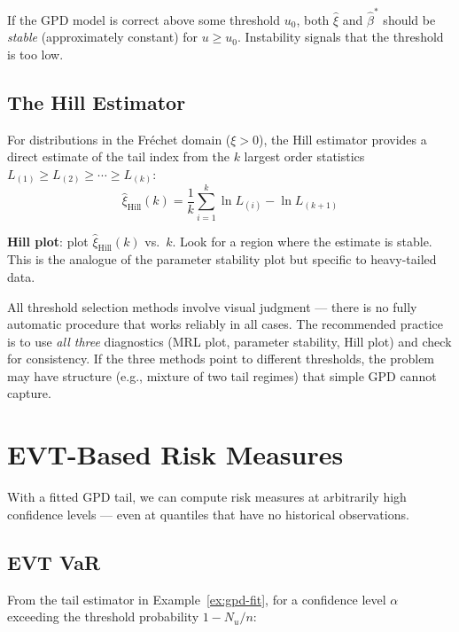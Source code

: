 \documentclass[11pt, a4paper]{article}
\theoremstyle{definition}
\theoremstyle{plain}
\theoremstyle{remark}
\begin{document}
If the GPD model is correct above some threshold $u_0$,
both $\hat\xi$ and $\hat\beta^*$ should be \emph{stable} (approximately constant) for $u \geq u_0$.
Instability signals that the threshold is too low.

\subsection{The Hill Estimator}

For distributions in the Fr\'echet domain ($\xi > 0$), the Hill estimator provides a direct estimate
of the tail index from the $k$ largest order statistics $L_{(1)} \geq L_{(2)} \geq \cdots \geq L_{(k)}$:
\[
    \hat\xi_{\text{Hill}}(k) = \frac{1}{k}\sum_{i=1}^{k} \ln L_{(i)} - \ln L_{(k+1)}
\]

\textbf{Hill plot}: plot $\hat\xi_{\text{Hill}}(k)$ vs.\ $k$.
Look for a region where the estimate is stable.
This is the analogue of the parameter stability plot but specific to heavy-tailed data.

\begin{warningbox}
All threshold selection methods involve visual judgment --- there is no fully automatic procedure
that works reliably in all cases.
The recommended practice is to use \emph{all three} diagnostics (MRL plot, parameter stability, Hill plot)
and check for consistency.
If the three methods point to different thresholds, the problem may have structure
(e.g., mixture of two tail regimes) that simple GPD cannot capture.
\end{warningbox}

\section{EVT-Based Risk Measures}
\label{sec:evt-risk}

With a fitted GPD tail, we can compute risk measures at arbitrarily high confidence levels ---
even at quantiles that have no historical observations.

\subsection{EVT VaR}

From the tail estimator in Example~\ref{ex:gpd-fit},
for a confidence level $\alpha$ exceeding the threshold probability $1 - N_u/n$:
\end{document}
